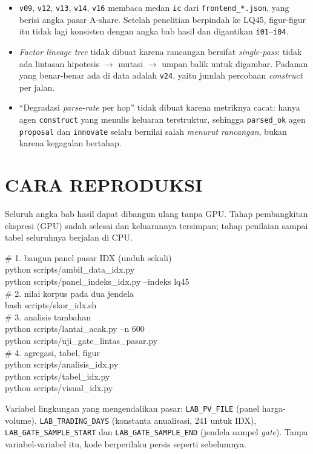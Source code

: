 \documentclass{laporanta1statugm}
\newcommand{\code}[1]{\texttt{#1}}
\begin{document}
\begin{itemize}
  \item \code{v09}, \code{v12}, \code{v13}, \code{v14}, \code{v16} membaca
        medan \code{ic} dari \code{frontend\_*.json}, yang berisi angka pasar
        A-share. Setelah penelitian berpindah ke LQ45, figur-figur itu tidak
        lagi konsisten dengan angka bab hasil dan digantikan
        \code{i01}--\code{i04}.
  \item \textit{Factor lineage tree} tidak dibuat karena rancangan bersifat
        \textit{single-pass}: tidak ada lintasan hipotesis $\to$ mutasi $\to$
        umpan balik untuk digambar. Padanan yang benar-benar ada di data adalah
        \code{v24}, yaitu jumlah percobaan \textit{construct} per jalan.
  \item ``Degradasi \textit{parse-rate} per hop'' tidak dibuat karena metriknya
        cacat: hanya agen \code{construct} yang menulis keluaran terstruktur,
        sehingga \code{parsed\_ok} agen \code{proposal} dan \code{innovate}
        selalu bernilai salah \emph{menurut rancangan}, bukan karena kegagalan
        bertahap.
\end{itemize}

\chapter{CARA REPRODUKSI}

Seluruh angka bab hasil dapat dibangun ulang tanpa GPU. Tahap pembangkitan
ekspresi (GPU) sudah selesai dan keluarannya tersimpan; tahap penilaian sampai
tabel seluruhnya berjalan di CPU.

\begin{kotakekspresi}
\# 1. bangun panel pasar IDX (unduh sekali)\\
python scripts/ambil\_data\_idx.py\\
python scripts/panel\_indeks\_idx.py --indeks lq45\\[1mm]
\# 2. nilai korpus pada dua jendela\\
bash scripts/skor\_idx.sh\\[1mm]
\# 3. analisis tambahan\\
python scripts/lantai\_acak.py --n 600\\
python scripts/uji\_gate\_lintas\_pasar.py\\[1mm]
\# 4. agregasi, tabel, figur\\
python scripts/analisis\_idx.py\\
python scripts/tabel\_idx.py\\
python scripts/visual\_idx.py
\end{kotakekspresi}

Variabel lingkungan yang mengendalikan pasar:
\code{LAB\_PV\_FILE} (panel harga-volume),
\code{LAB\_TRADING\_DAYS} (konstanta anualisasi, 241 untuk IDX),
\code{LAB\_GATE\_SAMPLE\_START} dan \code{LAB\_GATE\_SAMPLE\_END} (jendela
sampel \textit{gate}). Tanpa variabel-variabel itu, kode berperilaku persis
seperti sebelumnya.
\end{document}
